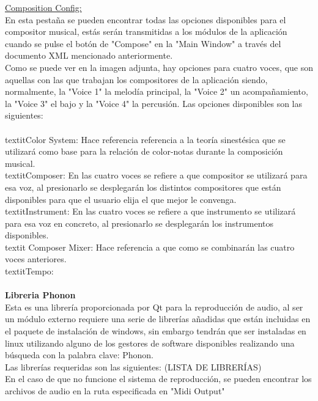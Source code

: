 {\underline{Composition Config:}
\\En esta pestaña se pueden encontrar todas las opciones disponibles para el compositor musical, estás serán transmitidas a los módulos de la aplicación cuando se pulse el botón de "Compose" en la "Main Window" a través del documento XML mencionado anteriormente.
\\Como se puede ver en la imagen adjunta, hay opciones para cuatro voces, que son aquellas con las que trabajan los compositores de la aplicación siendo, normalmente, la "Voice 1" la melodía principal, la "Voice 2" un acompañamiento, la "Voice 3" el bajo y la "Voice 4" la percusión. Las opciones disponibles son las siguientes:
\\
\newline
\\textit{Color System:} Hace referencia referencia a la teoría sinestésica que se utilizará como base para la relación de color-notas durante la composición musical.
\\textit{Composer:} En las cuatro voces se refiere a que compositor se utilizará para esa voz, al presionarlo se desplegarán los distintos compositores que están disponibles para que el usuario elija el que mejor le convenga.
\\textit{Instrument:} En las cuatro voces se refiere a que instrumento se utilizará para esa voz en concreto, al presionarlo se desplegarán los instrumentos disponibles.
\\textit {Composer Mixer:} Hace referencia a que como se combinarán las cuatro voces anteriores.
\\textit{Tempo:} 
\\
\newline
\\{\bf Libreria Phonon}
\\Esta es una librería proporcionada por Qt para la reproducción de audio, al ser un módulo externo requiere una serie de librerías añadidas que están incluidas en el paquete de instalación de windows, sin embargo tendrán que ser instaladas en linux utilizando alguno de los gestores de software disponibles realizando una búsqueda con la palabra clave: Phonon.
\\Las librerías requeridas son las siguientes: (LISTA DE LIBRERÍAS)
\\En el caso de que no funcione el sistema de reproducción, se pueden encontrar los archivos de audio en la ruta especificada en "Midi Output"
}
